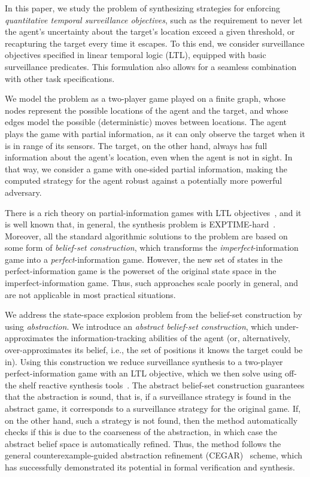 In this paper, we study the problem of synthesizing strategies for enforcing \emph{quantitative temporal surveillance objectives}, such as the requirement to never let the agent's uncertainty about the target's location exceed a given threshold, or recapturing the target every time it escapes. To this end, we consider surveillance objectives specified in linear temporal logic (LTL), equipped with basic surveillance predicates. This formulation also allows for a seamless combination with other task specifications.

We model the problem as a two-player game played on a finite graph, whose nodes represent the possible locations of the agent and the target, and whose edges model the possible (deterministic) moves between locations. The agent plays the game with partial information, as it can only observe the target when  it is in range of its sensors. The target, on the other hand, always has full information about the agent's location, even when the agent is not in sight. In that way, we consider a game with one-sided partial information, making the computed strategy for the agent robust against a potentially more powerful adversary. 

There is a rich theory on partial-information games with LTL objectives~\cite{DoyenR11,Chatterjee2013}, and it is well known that, in general, the synthesis problem is EXPTIME-hard~\cite{Reif84,BerwangerD08}. Moreover, all the standard algorithmic solutions to the problem are based on some form of \emph{belief-set construction}, which transforms the \emph{imperfect}-information game into a \emph{perfect}-information game. However, the new set of states in the perfect-information game is the powerset of the original state space in the imperfect-information game. Thus, such approaches scale poorly in general, and are not applicable in most practical situations.

We address the state-space explosion problem from the belief-set construction by using \emph{abstraction}. We introduce an \emph{abstract belief-set construction}, which under-approximates the information-tracking abilities of the agent (or, alternatively, over-approximates its belief, i.e., the set of positions it knows the target could be in). Using this construction we reduce surveillance synthesis to a two-player perfect-information game with an LTL objective, which we then solve using off-the shelf reactive synthesis tools~\cite{EhlersR16}. The abstract belief-set construction guarantees that the abstraction is sound, that is, if a surveillance strategy is found in the abstract game, it corresponds to a surveillance strategy for the original game. If, on the other hand, such a strategy is not found, then the method automatically checks if this is due to the coarseness of the abstraction, in which case the abstract belief space is automatically refined. Thus, the method follows the general counterexample-guided abstraction refinement (CEGAR)~\cite{ClarkeGJLV00} scheme, which has successfully demonstrated its potential in formal verification and synthesis.

